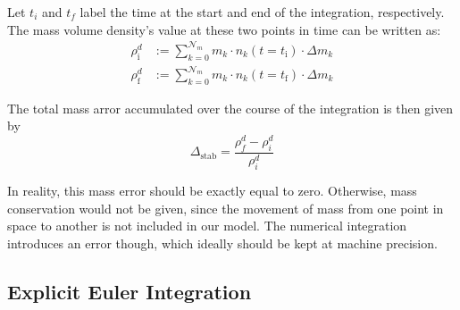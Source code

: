         Let $t_i$ and $t_f$ label the time at the start and end of the integration, respectively.
        The mass volume density's value at these two points in time can be written as:
        \begin{align}
            \rho_\text{i}^d
                &:=\sum_{k=0}^{\mathcal N_m} m_k\cdot n_k(t=t_\text{i})\cdot\Delta m_k
            \\
            \rho_\text{f}^d
                &:=\sum_{k=0}^{\mathcal N_m} m_k\cdot n_k(t=t_\text{f})\cdot\Delta m_k
        \end{align}

        The total mass arror accumulated over the course of the integration is then given by
        \begin{equation}
            \label{eq:definition_of_integration_mass_error_stability}
            \Delta_\text{stab} =\frac{\rho_f^d - \rho_i^d}{\rho_i^d}
        \end{equation}



        In reality, this mass error should be exactly equal to zero. Otherwise, mass conservation would not be given, since the movement of mass from one point in space to another is not included in our model. 
        The numerical integration introduces an error though, which ideally should be kept at machine precision. %

    \subsection{Explicit Euler Integration }
    \label{sec:explicit_euler}

